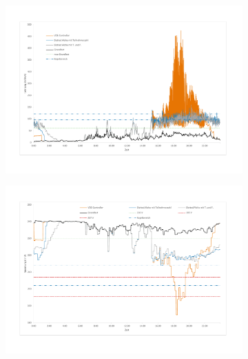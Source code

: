\begin{figure}
	\begin{subfigure}{\linewidth}
		\includegraphics[scale=0.5]{img/mitTrafo/Trafolast.pdf}
        \label{ABB_mT_Trafo}
	\end{subfigure}
	\begin{subfigure}{\linewidth}
		\includegraphics[scale=0.5]{img/mitTrafo/Spannung.pdf}
        \label{ABB_mT_Spannung}
	\end{subfigure}
\end{figure}
